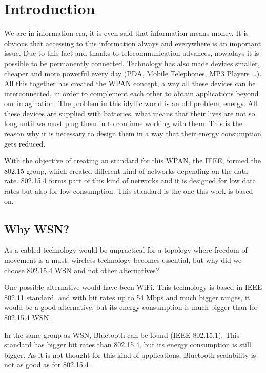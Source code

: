 \chapter{Introduction}
\label{chap:introduction}

We are in information era, it is even said that information means money. It is obvious that accessing to this information
always and everywhere is an important issue. Due to this fact and thanks to telecommunication advances, nowadays it is
possible to be permanently connected. Technology has also made devices smaller, cheaper and more powerful
every day (\ac{PDA}, Mobile Telephones, \ac{MP3} Players \ldots). All this together has created the \ac{WPAN} concept, a way 
all these devices can be interconnected, in order to complement each other to obtain applications beyond our imagination. The 
problem in this idyllic world is an old problem, energy. All these devices are supplied with batteries, what means that their 
lives are not so long until we must plug them in to continue working with them. This is the reason why it is necessary to design them
in a way that their energy consumption gets reduced.

With the objective of creating an standard for this \ac{WPAN}, the \ac{IEEE}, formed the 802.15 group, which created different 
kind of networks depending on the data rate. 802.15.4 forms part of this kind of networks and it is designed for low data rates but 
also for low consumption. This standard is the one this work is based on.

\section{Why \ac{WSN}?}

As a cabled technology would be unpractical for a topology where freedom of movement is a must, wireless technology becomes essential, 
but why did we choose 802.15.4 \ac{WSN} and not other alternatives?

One possible alternative would have been WiFi. This technology is based in \ac{IEEE} 802.11 standard, and with bit rates up to
54 Mbps and much bigger ranges, it would be a good alternative, but its energy consumption is much bigger than for 802.15.4 \ac{WSN} 
\cite{WirelessProtocolsComparison}.

In the same group as \ac{WSN}, Bluetooth can be found (\ac{IEEE} 802.15.1). This standard has bigger bit rates than 
802.15.4, but its energy consumption is still bigger. As it is not thought for this kind of applications, Bluetooth scalability
is not as good as for 802.15.4 \cite{WirelessProtocolsComparison}.

